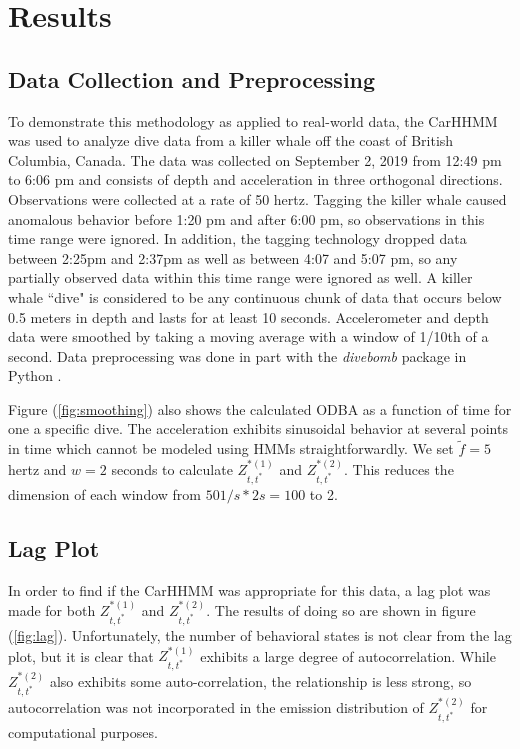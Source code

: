 
\section{Results}

\subsection{Data Collection and Preprocessing}

To demonstrate this methodology as applied to real-world data, the CarHHMM was used to analyze dive data from a killer whale off the coast of British Columbia, Canada. The data was collected on September 2, 2019 from 12:49 pm to 6:06 pm and consists of depth and acceleration in three orthogonal directions. Observations were collected at a rate of 50 hertz. Tagging the killer whale caused anomalous behavior before 1:20 pm and after 6:00 pm, so observations in this time range were ignored. In addition, the tagging technology dropped data between 2:25pm and 2:37pm as well as between 4:07 and 5:07 pm, so any partially observed data within this time range were ignored as well. A killer whale ``dive" is considered to be any continuous chunk of data that occurs below 0.5 meters in depth and lasts for at least 10 seconds. Accelerometer and depth data were smoothed by taking a moving average with a window of 1/10th of a second. Data preprocessing was done in part with the \textit{divebomb} package in Python \cite{Nunes:2018}.

Figure (\ref{fig:smoothing}) also shows the calculated ODBA as a function of time for one a specific dive. The acceleration exhibits sinusoidal behavior at several points in time which cannot be modeled using HMMs straightforwardly. We set $\tilde{f} = 5$ hertz and $w = 2$ seconds to calculate $Z^{*(1)}_{t,t^*}$ and $Z^{*(2)}_{t,t^*}$. This reduces the dimension of each window from $50 1/s * 2 s = 100$ to 2.

\subsection{Lag Plot}

In order to find if the CarHHMM was appropriate for this data, a lag plot was made for both $Z^{*(1)}_{t,t^*}$ and $Z^{*(2)}_{t,t^*}$. The results of doing so are shown in figure (\ref{fig:lag}). Unfortunately, the number of behavioral states is not clear from the lag plot, but it is clear that $Z^{*(1)}_{t,t^*}$ exhibits a large degree of autocorrelation. While $Z^{*(2)}_{t,t^*}$ also exhibits some auto-correlation, the relationship is less strong, so autocorrelation was not incorporated in the emission distribution of $Z^{*(2)}_{t,t^*}$ for computational purposes.

